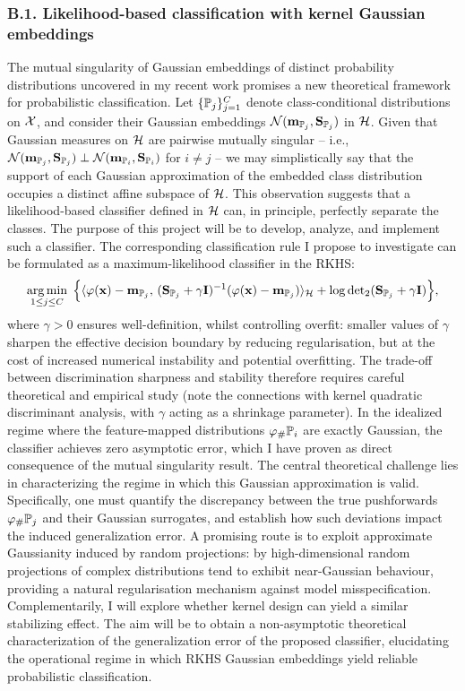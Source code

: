 \documentclass{article}
\begin{document}
\subsubsection*{B.1.  Likelihood-based classification with kernel Gaussian embeddings}

The mutual singularity of Gaussian embeddings of distinct probability distributions uncovered in my recent work \cite{santoro2025from} promises a new theoretical framework for probabilistic classification. 
Let $\{\mathbb{P}_j\}_{j=1}^C$ denote class-conditional distributions on $\mathcal{X}$, and consider their Gaussian embeddings $\mathcal{N}(\mathbf{m}_{\mathbb{P}_j}, \mathbf{S}_{\mathbb{P}_j})$ in $\mathcal{H}$. Given that Gaussian measures on $\mathcal{H}$ are pairwise mutually singular -- i.e., $\mathcal{N}(\mathbf{m}_{\mathbb{P}_j}, \mathbf{S}_{\mathbb{P}_j}) \perp \mathcal{N}(\mathbf{m}_{\mathbb{P}_i}, \mathbf{S}_{\mathbb{P}_i})$ for $i \neq j$ --  we may simplistically say that the support of each Gaussian approximation of the embedded class distribution occupies a distinct affine subspace of $\mathcal{H}$. This observation suggests that a likelihood-based classifier defined in $\mathcal{H}$ can, in principle, perfectly separate the classes. The purpose of this project will be to develop, analyze, and implement such a classifier.
The corresponding classification rule I propose to investigate can be formulated as a maximum-likelihood classifier in the RKHS:
\begin{equation}
\label{eq:multiclass_rule}
\operatorname*{arg\,min}_{1 \le j \le C}
\; \Big\{
  \langle \varphi(\mathbf{x}) - \mathbf{m}_{\mathbb{P}_j},\, (\mathbf{S}_{\mathbb{P}_j}+\gamma \mathbf{I})^{-1} (\varphi(\mathbf{x}) - \mathbf{m}_{\mathbb{P}_j}) \rangle_{\mathcal{H}}
  + \log \operatorname{det}_2(\mathbf{S}_{\mathbb{P}_j}+\gamma \mathbf{I})
\Big\}, \nonumber
\end{equation}
where $\gamma > 0$ ensures well-definition, whilst controlling overfit: smaller values of $\gamma$ sharpen the effective decision boundary by reducing regularisation, but at the cost of increased numerical instability and potential overfitting. The trade-off between discrimination sharpness and stability therefore requires careful theoretical and empirical study (note the connections with kernel quadratic discriminant analysis, with $\gamma$ acting as a shrinkage parameter). In the idealized regime where the feature-mapped distributions $\varphi_\# \mathbb{P}_i$ are exactly Gaussian, the classifier achieves zero asymptotic error, which I have proven as direct consequence of the mutual singularity result.
The central theoretical challenge lies in characterizing the regime in which this Gaussian approximation is valid. Specifically, one must quantify the discrepancy between the true pushforwards $\varphi_\# \mathbb{P}_j$ and their Gaussian surrogates, and establish how such deviations impact the induced generalization error. A promising route is to exploit approximate Gaussianity induced by random projections: by \citet{diaconis1984asymptotics} high-dimensional random projections of complex distributions tend to exhibit near-Gaussian behaviour, providing a natural regularisation mechanism against model misspecification. Complementarily, I will explore whether kernel design can yield a similar stabilizing effect. The aim will be to obtain a non-asymptotic theoretical characterization of the generalization error of the proposed classifier, elucidating the operational regime in which RKHS Gaussian embeddings yield reliable probabilistic classification.
\end{document}
